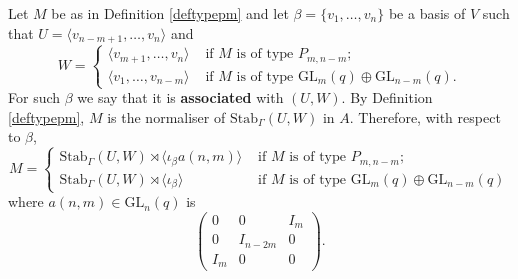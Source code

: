 \documentclass[a4paper,reqno,11pt]{amsart}
\theoremstyle{definition}
\theoremstyle{remark}
\numberwithin{equation}{section}
\newcommand{\GL}{{\mathrm{GL}}}
\begin{document}
Let  $M$ be as in Definition \ref{deftypepm} and let $\beta=\{v_1, \ldots, v_n\}$ be a basis of $V$ such that $U=\langle v_{n-m+1}, \ldots, v_n \rangle$ and 
$$W= \begin{cases}
\langle v_{m+1}, \ldots, v_n\rangle &\text{ if } M \text{ is of type } P_{m, n-m};\\
\langle v_1, \ldots, v_{n-m}\rangle &\text{ if } M \text{ is of type } \GL_{m}(q) \oplus \GL_{n-m}(q).
\end{cases} 
$$ 
For such $\beta$ we say that it is {\bf associated} with $(U,W).$
 By Definition \ref{deftypepm}, $M$ is the normaliser of $\mathrm{Stab}_{\Gamma}(U,W)$ in $A$. Therefore, with respect to $\beta$,
\begin{equation}
\label{Mstr}
M =\begin{cases}
\mathrm{Stab}_{\Gamma}(U,W) \rtimes \langle \iota_{\beta}a(n,m) \rangle & \text{ if } M \text{ is of type } P_{m, n-m};\\
\mathrm{Stab}_{\Gamma}(U,W) \rtimes \langle \iota_{\beta} \rangle & \text{ if } M \text{ is of type } \GL_{m}(q) \oplus \GL_{n-m}(q)
\end{cases}
\end{equation}
where $a(n,m) \in \GL_n(q)$ is 
\begin{equation}
\label{adef}
\begin{pmatrix}
0 & 0 & I_{m} \\
0 & I_{n-2m} & 0 \\
I_{m} & 0 & 0
\end{pmatrix}.
\end{equation}
\end{document}
